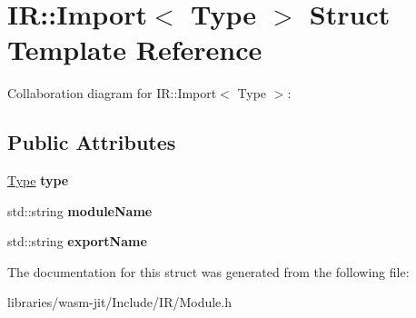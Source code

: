 \hypertarget{struct_i_r_1_1_import}{}\section{IR\+:\+:Import$<$ Type $>$ Struct Template Reference}
\label{struct_i_r_1_1_import}


Collaboration diagram for IR\+:\+:Import$<$ Type $>$\+:
\subsection*{Public Attributes}
\begin{DoxyCompactItemize}
\item 
\mbox{\label{struct_i_r_1_1_import_a06fd0da69fee73203786db810a9fedcf}} 
\mbox{\hyperlink{struct_type}{Type}} {\bfseries type}
\item 
\mbox{\label{struct_i_r_1_1_import_a497ea0902dd2d7f4fab4c3ff31f0c680}} 
std\+::string {\bfseries module\+Name}
\item 
\mbox{\label{struct_i_r_1_1_import_a4919e85e9151e5c18dd5168341dfe544}} 
std\+::string {\bfseries export\+Name}
\end{DoxyCompactItemize}


The documentation for this struct was generated from the following file\+:\begin{DoxyCompactItemize}
\item 
libraries/wasm-\/jit/\+Include/\+I\+R/Module.\+h\end{DoxyCompactItemize}
